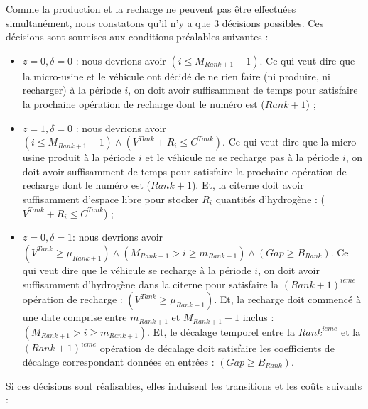 Comme la production et la recharge ne peuvent pas être effectuées simultanément, nous constatons qu'il n'y a que 3 décisions possibles. Ces décisions sont soumises aux conditions préalables suivantes :
\begin{itemize}[label=$\square$]
	\item $z = 0, \delta = 0$ : nous devrions avoir $(i \leq M_{Rank+1} - 1)$. Ce qui veut dire que la micro-usine et le véhicule ont décidé de ne rien faire (ni produire, ni recharger) à la période $i$, on doit avoir suffisamment de temps pour satisfaire la prochaine opération de recharge dont le numéro est ($Rank+1$) ;
	\item $z = 1, \delta = 0$ : nous devrions avoir $(i \leq M_{Rank+1} - 1) \land (V^{Tank} + R_i \leq C^{Tank})$. Ce qui veut dire que la micro-usine produit à la période $i$ et le véhicule ne se recharge pas à la période $i$, on doit avoir suffisamment de temps pour satisfaire la prochaine opération de recharge dont le numéro est ($Rank+1$). Et, la citerne doit avoir suffisamment d'espace libre pour stocker $R_i$ quantités d'hydrogène : ($V^{Tank} + R_i \leq C^{Tank}$) ;
	\item $z = 0, \delta = 1 $: nous devrions avoir 
	$(V^{Tank} \geq \mu_{Rank+1}) \land (M_{Rank+1} > i \geq m_{Rank+1}) \land (Gap \geq B_{Rank})$. Ce qui veut dire que le véhicule se recharge à la période $i$, on doit avoir suffisamment d'hydrogène dans la citerne pour satisfaire la $(Rank+1)^{ieme}$ opération de recharge : $(V^{Tank} \geq \mu_{Rank+1})$. Et, la recharge doit commencé à une date comprise entre $m_{Rank+1}$ et $M_{Rank+1}-1$ inclus : $(M_{Rank+1} > i \geq m_{Rank+1})$. Et, le décalage temporel entre la $Rank^{ieme}$ et la $(Rank+1)^{ieme}$ opération de décalage doit satisfaire les coefficients de décalage correspondant données en entrées : $(Gap \geq B_{Rank})$.
\end{itemize}
Si ces décisions sont réalisables, elles induisent les transitions et les coûts suivants :
